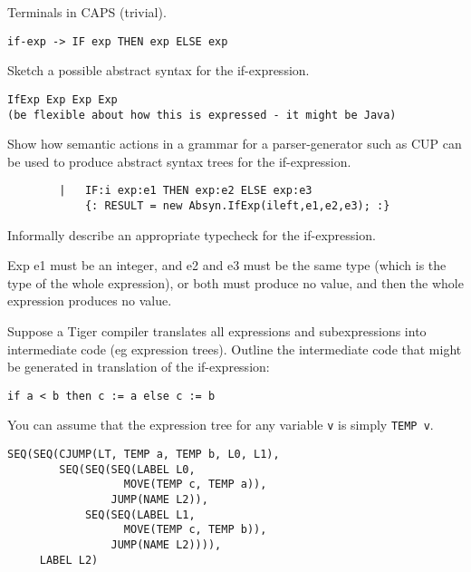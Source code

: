 \documentclass[11pt]{cityexam}
\begin{document}
\begin{questions}
\begin{subquestions}
\begin{modelanswer}
Terminals in CAPS (trivial).
\begin{verbatim}
if-exp -> IF exp THEN exp ELSE exp
\end{verbatim}
\end{modelanswer}

\subquestion
Sketch a possible abstract syntax for the if-expression.

\begin{modelanswer}
\begin{verbatim}
IfExp Exp Exp Exp
(be flexible about how this is expressed - it might be Java)
\end{verbatim}
\end{modelanswer}

\subquestion
Show how semantic actions in a grammar for a parser-generator such as CUP
can be used to produce abstract syntax trees for the if-expression. 

\begin{modelanswer}
\begin{verbatim}
        |   IF:i exp:e1 THEN exp:e2 ELSE exp:e3
            {: RESULT = new Absyn.IfExp(ileft,e1,e2,e3); :}
\end{verbatim}
\end{modelanswer}

\subquestion
Informally describe an appropriate typecheck for the if-expression.

\begin{modelanswer}
Exp e1 must be an integer, and e2 and e3 must be the same type 
(which is the type of the whole expression), or both must produce no value,
and then the whole expression produces no value.
\end{modelanswer}

\subquestion

Suppose a Tiger compiler translates all expressions and subexpressions
into intermediate code (eg expression trees).
Outline the intermediate code that might be generated
in translation of the if-expression:
\begin{verbatim}
if a < b then c := a else c := b
\end{verbatim}
You can assume that the expression tree for any variable \verb"v" is
simply \verb"TEMP v".

\begin{modelanswer}
\begin{verbatim}
SEQ(SEQ(CJUMP(LT, TEMP a, TEMP b, L0, L1),
        SEQ(SEQ(SEQ(LABEL L0,
                  MOVE(TEMP c, TEMP a)),
                JUMP(NAME L2)),
            SEQ(SEQ(LABEL L1,
                  MOVE(TEMP c, TEMP b)),
                JUMP(NAME L2)))),
     LABEL L2)


\end{verbatim}
\end{modelanswer}
\end{subquestions}
\end{questions}
\end{document}
